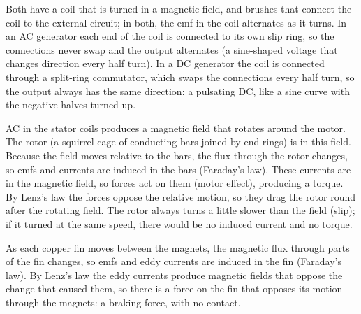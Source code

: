 \documentclass[12pt]{article}
\begin{document}
\ansq
\begin{crit}
\end{crit}
\sample
Both have a coil that is turned in a magnetic field, and brushes that connect the coil to the external
circuit; in both, the emf in the coil alternates as it turns. In an AC generator each end of the coil is
connected to its own slip ring, so the connections never swap and the output alternates (a sine-shaped
voltage that changes direction every half turn). In a DC generator the coil is connected through a
split-ring commutator, which swaps the connections every half turn, so the output always has the same
direction: a pulsating DC, like a sine curve with the negative halves turned up.

\ansq
\begin{crit}
\end{crit}
\sample
AC in the stator coils produces a magnetic field that rotates around the motor. The rotor (a squirrel
cage of conducting bars joined by end rings) is in this field. Because the field moves relative to the
bars, the flux through the rotor changes, so emfs and currents are induced in the bars (Faraday's law).
These currents are in the magnetic field, so forces act on them (motor effect), producing a torque. By
Lenz's law the forces oppose the relative motion, so they drag the rotor round after the rotating field.
The rotor always turns a little slower than the field (slip); if it turned at the same speed, there would
be no induced current and no torque.

\ansq
\begin{crit}
\end{crit}
\sample
As each copper fin moves between the magnets, the magnetic flux through parts of the fin changes, so
emfs and eddy currents are induced in the fin (Faraday's law). By Lenz's law the eddy currents produce
magnetic fields that oppose the change that caused them, so there is a force on the fin that opposes its
motion through the magnets: a braking force, with no contact.
\end{document}

